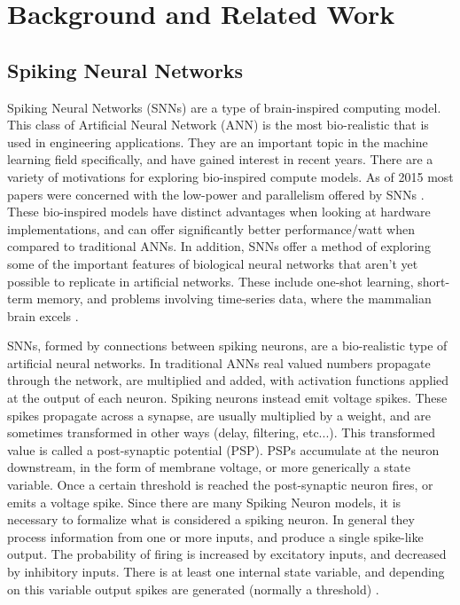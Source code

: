 %
%


\chapter{Background and Related Work}\label{section:background}
    \section{Spiking Neural Networks}
    Spiking Neural Networks (SNNs) are a type of brain-inspired computing model. This class of
    Artificial Neural Network (ANN) is the most bio-realistic that is used in
    engineering applications. They are an important topic in the machine
    learning field specifically, and have gained interest in recent years. There
    are a variety of motivations for exploring bio-inspired compute models. As
    of 2015 most papers were concerned with the low-power and parallelism
    offered by SNNs \cite{schuman_2017}. These bio-inspired models
    have distinct advantages when looking at hardware implementations, and can
    offer significantly better performance/watt when compared to traditional
    ANNs. In addition, SNNs offer a method of exploring some of the important
    features of biological neural networks that aren't yet possible to replicate
    in artificial networks. These include one-shot learning, short-term memory,
    and problems involving time-series data, where the mammalian brain excels
    \cite{kasabov_2013}.

    
    SNNs, formed by connections between spiking neurons, are a bio-realistic
    type of artificial neural networks. In traditional ANNs real valued numbers
    propagate through the network, are multiplied and added, with activation
    functions applied at the output of each neuron. Spiking neurons instead emit
    voltage spikes. These spikes propagate across a synapse, are usually
    multiplied by a weight, and are sometimes transformed in other ways (delay,
    filtering, etc...). This transformed value is called a post-synaptic
    potential (PSP). PSPs accumulate at the neuron downstream, in the form of
    membrane voltage, or more generically a state variable. Once a certain
    threshold is reached the post-synaptic neuron fires, or emits a voltage
    spike. Since there are many Spiking Neuron models, it is necessary to
    formalize what is considered a spiking neuron. In general they process
    information from one or more inputs, and produce a single spike-like
    output. The probability of firing is increased by excitatory inputs, and
    decreased by inhibitory inputs. There is at least one internal state
    variable, and depending on this variable output spikes are generated
    (normally a threshold) \cite{ponulak_2011}.
    
